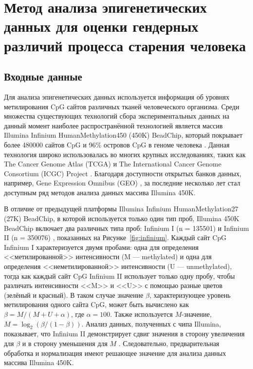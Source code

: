 \chapter{Метод анализа эпигенетических данных для оценки гендерных различий процесса старения человека}\label{ch:ch2}

\section{Входные данные}\label{sec:ch2/sec1}

Для анализа эпигенетических данных используется информация об уровнях метилирования CpG сайтов различных тканей человеческого организма. Среди множества существующих технологий сбора экспериментальных данных на данный момент наиболее распространённой технологией является массив Illumina Infinium HumanMethylation450 (450K) BeadChip, который покрывает более 480000 сайтов CpG и 96\% островов CpG в геноме человека \autocite{Bibikova2011}. Данная технология широко использовалась во многих крупных исследованиях, таких как The Cancer Genome Atlas (TCGA) и The International Cancer Genome Consortium (ICGC) Project \autocite{ICGC2010}. Благодаря доступности открытых банков данных, например, Gene Expression Omnibus (GEO) \autocite{Barrett2012}, за последние несколько лет стал доступным ряд методов анализа данных массива Illumina 450K.

В отличие от предыдущей платформы Illumina Infinium HumanMethylation27 (27K) BeadChip, в которой используется только один тип проб, Illumina 450K BeadChip включает два различных типа проб: Infinium I (n = 135501) и Infinium II (n = 350076) \autocite{Bibikova2011}, показанных на Рисунке~\ref{fig:infinium}. Каждый сайт CpG Infinium I характеризуется двумя пробами: одна для определения <<метилированной>> интенсивности (M --- methylated) и одна для определения <<неметилированной>> интенсивности (U --- unmethylated), тогда как каждый сайт CpG Infinium II использует только одну пробу, чтобы различать интенсивности <<M>> и <<U>> с помощью разные цветов (зелёный и красный). В таком случае значение $\beta$, характеризующее уровень метилирования одного сайта CpG, может быть вычислено как $\beta = M / (M + U + \alpha)$, где $\alpha = 100$. Также используется $M$-значение, $M = \log_2 (\beta / (1-\beta))$. Анализ данных, полученных с чипа Illumina, показывает, что Infinium II демонстрирует сдвиг значения в сторону увеличения для $\beta$ и в сторону уменьшения для $M$ \autocite{Dedeurwaerder2011}. Следовательно, предварительная обработка и нормализация имеют решающее значение для анализа данных массива Illumina 450K. 

